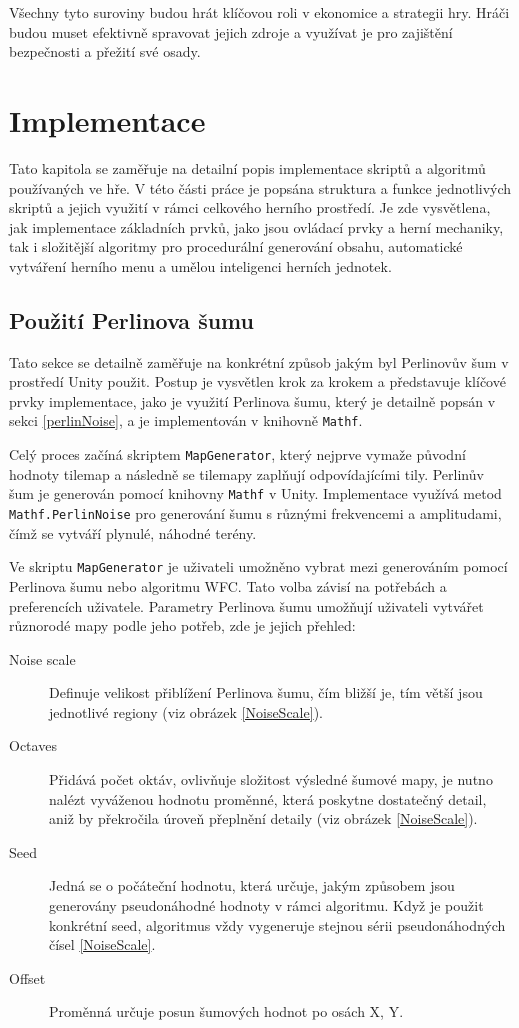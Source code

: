 Všechny tyto suroviny budou hrát klíčovou roli v ekonomice a strategii hry. Hráči budou muset efektivně spravovat jejich zdroje a využívat je pro zajištění bezpečnosti a přežití své osady.

\chapter{Implementace}
\label{implementace}
Tato kapitola se zaměřuje na detailní popis implementace skriptů a algoritmů používaných ve hře. V této části práce je popsána struktura a funkce jednotlivých skriptů a jejich využití v rámci celkového herního prostředí. Je zde vysvětlena, jak implementace základních prvků, jako jsou ovládací prvky a herní mechaniky, tak i složitější algoritmy pro procedurální generování obsahu, automatické vytváření herního menu a umělou inteligenci herních jednotek.

\section{Použití Perlinova šumu}

Tato sekce se detailně zaměřuje na konkrétní způsob jakým byl Perlinovův šum v prostředí Unity použit. Postup je vysvětlen krok za krokem a představuje klíčové prvky implementace, jako je využití Perlinova šumu, který je detailně popsán v sekci \ref{perlinNoise}, a je implementován v knihovně \texttt{Mathf}. 

Celý proces začíná skriptem \texttt{MapGenerator}, který nejprve vymaže původní hodnoty tilemap a následně se tilemapy zaplňují odpovídajícími tily. Perlinův šum je generován pomocí knihovny \texttt{Mathf} v Unity. Implementace využívá metod \texttt{Mathf.PerlinNoise} pro generování šumu s různými frekvencemi a amplitudami, čímž se vytváří plynulé, náhodné terény.

Ve skriptu \texttt{MapGenerator} je uživateli umožněno vybrat mezi generováním pomocí Perlinova šumu nebo algoritmu WFC. Tato volba závisí na potřebách a preferencích uživatele. Parametry Perlinova šumu umožňují uživateli vytvářet různorodé mapy podle jeho potřeb, zde je jejich přehled:
\begin{description}
	\item[Noise scale] Definuje velikost přiblížení Perlinova šumu, čím bližší je, tím větší jsou jednotlivé regiony (viz obrázek \ref{NoiseScale}).
	\item[Octaves] Přidává počet oktáv, ovlivňuje složitost výsledné šumové mapy, je nutno nalézt vyváženou hodnotu proměnné, která poskytne dostatečný detail, aniž by překročila úroveň přeplnění detaily (viz obrázek \ref{NoiseScale}).
 	\item[Seed] Jedná se o počáteční hodnotu, která určuje, jakým způsobem jsou generovány pseudonáhodné hodnoty v rámci algoritmu. Když je použit konkrétní seed, algoritmus vždy vygeneruje stejnou sérii pseudonáhodných čísel \ref{NoiseScale}.
 	\item[Offset] Proměnná určuje posun šumových hodnot po osách X, Y.
\end{description}

